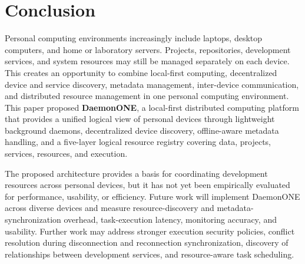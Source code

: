 \documentclass[10pt,twocolumn]{article}
\newcommand{\resourceRegistryName}{five-layer logical resource registry}
\begin{document}
\section{Conclusion}\label{sec:conclusion}
Personal computing environments increasingly include laptops, desktop computers, and home or laboratory servers. Projects, repositories, development services, and system resources may still be managed separately on each device. This creates an opportunity to combine local-first computing, decentralized device and service discovery, metadata management, inter-device communication, and distributed resource management in one personal computing environment. This paper proposed \textbf{DaemonONE}, a local-first distributed computing platform that provides a unified logical view of personal devices through lightweight background daemons, decentralized device discovery, offline-aware metadata handling, and a \resourceRegistryName{} covering data, projects, services, resources, and execution.

The proposed architecture provides a basis for coordinating development resources across personal devices, but it has not yet been empirically evaluated for performance, usability, or efficiency. Future work will implement DaemonONE across diverse devices and measure resource-discovery and metadata-synchronization overhead, task-execution latency, monitoring accuracy, and usability. Further work may address stronger execution security policies, conflict resolution during disconnection and reconnection synchronization, discovery of relationships between development services, and resource-aware task scheduling.
\end{document}
